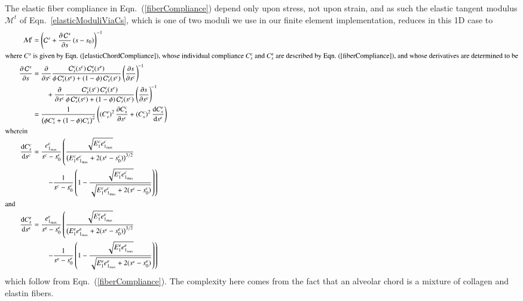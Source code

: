 The elastic fiber compliance in Eqn.~(\ref{fiberCompliance}) depend only upon stress, not upon strain, and as such the elastic tangent modulus $\boldsymbol{\mathcal{M}}^t$ of Eqn.~\eqref{elasticModuliViaCs}, which is one of two moduli we use in our finite element implementation, reduces in this 1D case to
\begin{subequations}
    \label{fiberTangentModulus}
    \begin{align}
    \mathcal{M}^t & = \left( \mathcal{C}^s + \frac{\partial \, \mathcal{C}^s}
    {\partial s} \, (s - s_0) \right)^{-1} \\
    \intertext{where $C^s$ is given by Eqn.~(\ref{elasticChordCompliance}), whose individual compliance $C^c_s$ and $C^e_s$ are described by Eqn.~(\ref{fiberCompliance}), and whose derivatives are determined to be}
    \mbox{} \qquad \frac{\partial \, \mathcal{C}^s}{\partial s} & = 
    \frac{\partial}{\partial s^c} 
    \frac{\mathcal{C}_s^c (s^c) \, \mathcal{C}_s^e (s^e)}
    {\phi \, \mathcal{C}_s^e (s^e) + (1-\phi) \, \mathcal{C}_s^c (s^c)}
    \left( \frac{\partial s}{\partial s^c} \right)^{\! -1} \notag \\ 
    \mbox{} & \qquad + \frac{\partial}{\partial s^e} 
    \frac{\mathcal{C}_s^c (s^c) \, \mathcal{C}_s^e (s^e)} 
    {\phi \, \mathcal{C}_s^e (s^e) + (1-\phi) \, \mathcal{C}_s^c (s^c)}
    \left( \frac{\partial s}{\partial s^e} \right)^{\! -1} \notag \\ 
    & = \frac{1}{\bigl( \phi C^e_s + (1-\phi) C^c_s \bigr)^2} \left(
    (C^e_s)^2 \, \frac{\partial C^c_s}{\partial s^c} + (C^c_s)^2 \,
    \frac{\mathrm{d} C^e_s}{\mathrm{d} s^e} \right) \\
    \intertext{wherein}
    \frac{\mathrm{d}C^c_s}{\mathrm{d}s^c} & = \frac{e^c_{1_{\max}}}{s^c - s^c_0} 
    \left( \frac{\sqrt{E^c_1 e^c_{1_{\max}}}}
    {\bigl( E^c_1 e^c_{1_{\max}} + 2 (s^c - s^c_0) \bigr)^{3/2}} \right. \notag \\
    \mbox{} & \qquad \left. - 
    \frac{1}{s^c-s^c_0} \left( 1 - \frac{\sqrt{E^c_1 e^c_{1_{\max}}}}
    {\sqrt{E^c_1 e^c_{1_{\max}} + 2 (s^c - s^c_0)}} \right) \right) \\
    \intertext{and}
    \frac{\mathrm{d}C^e_s}{\mathrm{d}s^e} & = \frac{e^e_{1_{\max}}}{s^e - s^e_0} 
    \left( \frac{\sqrt{E^e_1 e^e_{1_{\max}}}}
    {\bigl( E^e_1 e^e_{1_{\max}} + 2 (s^e - s^e_0) \bigr)^{3/2}} \right. \notag \\
    \mbox{} & \qquad \left. - 
    \frac{1}{s^e-s^e_0} \left( 1 - \frac{\sqrt{E^e_1 e^e_{1_{\max}}}}
    {\sqrt{E^e_1 e^e_{1_{\max}} + 2 (s^e - s^e_0)}} \right) \right)
    \end{align}
\end{subequations}
which follow from Eqn.~(\ref{fiberCompliance}).  The complexity here comes from the fact that an alveolar chord is a mixture of collagen and elastin fibers.

